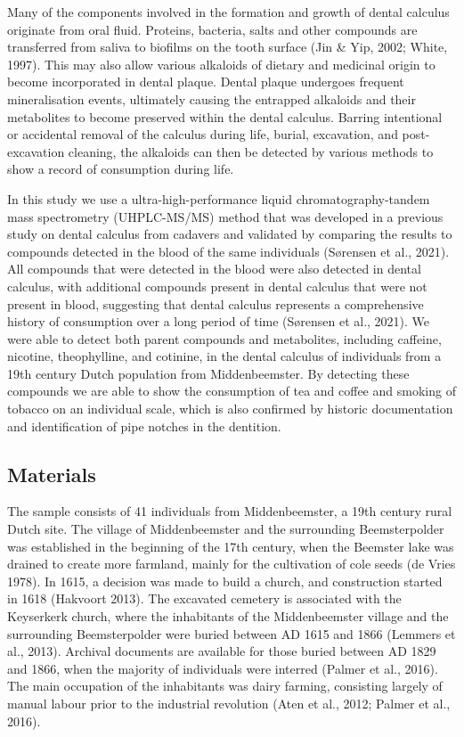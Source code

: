 \documentclass[
]{article}
\begin{document}
Many of the components involved in the formation and growth of dental
calculus originate from oral fluid. Proteins, bacteria, salts and other
compounds are transferred from saliva to biofilms on the tooth surface
(Jin \& Yip, 2002; White, 1997). This may also allow various alkaloids
of dietary and medicinal origin to become incorporated in dental plaque.
Dental plaque undergoes frequent mineralisation events, ultimately
causing the entrapped alkaloids and their metabolites to become
preserved within the dental calculus. Barring intentional or accidental
removal of the calculus during life, burial, excavation, and
post-excavation cleaning, the alkaloids can then be detected by various
methods to show a record of consumption during life.

In this study we use a ultra-high-performance liquid
chromatography-tandem mass spectrometry (UHPLC-MS/MS) method that was
developed in a previous study on dental calculus from cadavers and
validated by comparing the results to compounds detected in the blood of
the same individuals (Sørensen et al., 2021). All compounds that were
detected in the blood were also detected in dental calculus, with
additional compounds present in dental calculus that were not present in
blood, suggesting that dental calculus represents a comprehensive
history of consumption over a long period of time (Sørensen et al.,
2021). We were able to detect both parent compounds and metabolites,
including caffeine, nicotine, theophylline, and cotinine, in the dental
calculus of individuals from a 19th century Dutch population from
Middenbeemster. By detecting these compounds we are able to show the
consumption of tea and coffee and smoking of tobacco on an individual
scale, which is also confirmed by historic documentation and
identification of pipe notches in the dentition.

\hypertarget{materials}{%
\subsection{Materials}\label{materials}}

The sample consists of 41 individuals from Middenbeemster, a 19th
century rural Dutch site. The village of Middenbeemster and the
surrounding Beemsterpolder was established in the beginning of the 17th
century, when the Beemster lake was drained to create more farmland,
mainly for the cultivation of cole seeds (de Vries 1978). In 1615, a
decision was made to build a church, and construction started in 1618
(Hakvoort 2013). The excavated cemetery is associated with the
Keyserkerk church, where the inhabitants of the Middenbeemster village
and the surrounding Beemsterpolder were buried between AD 1615 and 1866
(Lemmers et al., 2013). Archival documents are available for those
buried between AD 1829 and 1866, when the majority of individuals were
interred (Palmer et al., 2016). The main occupation of the inhabitants
was dairy farming, consisting largely of manual labour prior to the
industrial revolution (Aten et al., 2012; Palmer et al., 2016).
\end{document}
